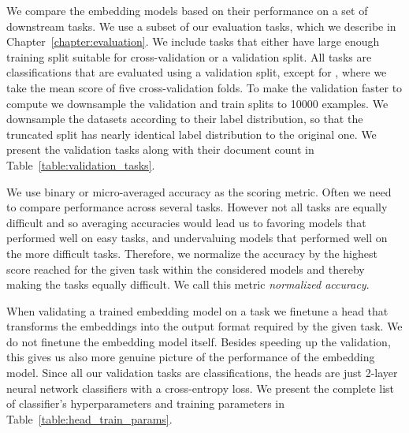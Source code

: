 We compare the embedding models based on their performance on a set of
downstream tasks. We use a subset of our evaluation tasks, which we describe in
Chapter~\ref{chapter:evaluation}. We include tasks that either have large
enough training split suitable for cross-validation or a validation split. All
tasks are classifications that are evaluated using a validation split, except
for , where we take the mean score of five cross-validation folds.
To make the validation faster to compute we downsample the validation and train
splits to 10000 examples. We downsample the datasets according to their label
distribution, so that the truncated split has nearly identical label
distribution to the original one. We present the validation tasks along with
their document count in Table~\ref{table:validation_tasks}.

We use binary or micro-averaged accuracy as the scoring metric. Often we need to
compare performance across several tasks. However not all tasks are equally
difficult and so averaging accuracies would lead us to favoring models that
performed well on easy tasks, and undervaluing models that performed well on the
more difficult tasks. Therefore, we normalize the accuracy by the highest score
reached for the given task within the considered models and thereby making the
tasks equally difficult. We call this metric \emph{normalized accuracy}.

When validating a trained embedding model on a task we finetune a head that
transforms the embeddings into the output format required by the given task. We
do not finetune the embedding model itself. Besides speeding up the validation,
this gives us also more genuine picture of the performance of the embedding
model. Since all our validation tasks are classifications, the heads are just
2-layer neural network classifiers with a cross-entropy loss. We present the
complete list of classifier's hyperparameters and training parameters in
Table~\ref{table:head_train_params}.

